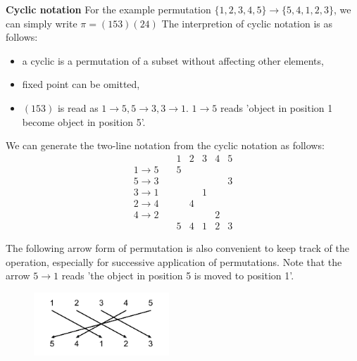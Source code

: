 \documentclass{amsart}
\begin{document}
\textbf{Cyclic notation}
For the example permutation $\{1,2,3,4,5\} \to \{ 5,4,1,2,3 \}$, we can simply write
$\pi = (153)(24)$
The interpretion of cyclic notation is as follows:
\begin{itemize}
    \item a cyclic is a permutation of a subset without affecting other elements,
    \item fixed point can be omitted,
    \item $(153)$ is read as $1\to 5, 5\to 3, 3\to 1$. $1\to5$ reads 'object in position 1 become object in position 5'.
\end{itemize}
We can generate the two-line notation from the cyclic notation as follows:
\begin{equation*}
    \begin{matrix}
                & 1 & 2 & 3 & 4 & 5 \\
        1 \to 5 \quad & 5 &   &   &   &   \\
        5 \to 3 \quad &   &   &   &   & 3 \\
        3 \to 1 \quad &   &   & 1 &   &   \\
        2 \to 4 \quad &   & 4 &   &   &   \\
        4 \to 2 \quad &   &   &   & 2 &   \\
                & 5 & 4 & 1 & 2 & 3
    \end{matrix}
\end{equation*}

The following arrow form of permutation is also convenient to keep track of the operation, especially for successive 
application of permutations. Note that the arrow $5\to1$ reads 'the object in position 5 is moved to position 1'.
\begin{figure}[!h]
    \centering
    \includegraphics[width=2in]{figures/permutation_arrow.png}
\end{figure}
\end{document}
